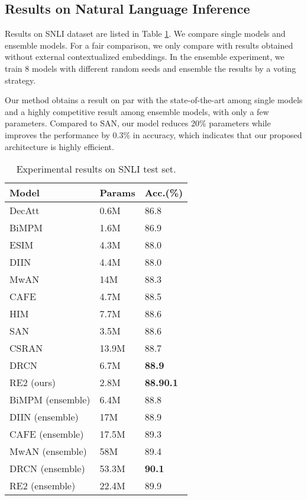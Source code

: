 \documentclass[11pt,a4paper]{article}
\begin{document}
\subsection{Results on Natural Language Inference}

Results on SNLI dataset are listed in Table \ref{tab:snli-result}. We compare single models and ensemble models. For a fair comparison, we only compare with results obtained without external contextualized embeddings. In the ensemble experiment, we train 8 models with different random seeds and ensemble the results by a voting strategy. 

Our method obtains a result on par with the state-of-the-art among single models and a highly competitive result among ensemble models, with only a few parameters. Compared to SAN, our model reduces 20\% parameters while improves the performance by 0.3\% in accuracy, which indicates that our proposed architecture is highly efficient. 

\begin{table}
  \centering
  \small
  \begin{tabular}{|l|l|l|}
  \hline
  {\bf Model} & {\bf Params} & {\bf Acc.(\%)}\\\hline
    DecAtt \cite{parikh2016decomposable} & 0.6M & 86.8 \\
    BiMPM \cite{wang2017bilateral} & 1.6M & 86.9 \\
    ESIM \cite{chen2017enhanced} & 4.3M & 88.0 \\ 
    DIIN \cite{gong2018natural} & 4.4M & 88.0 \\ 
    MwAN \cite{tan2018multiway} & 14M & 88.3 \\
    CAFE \cite{tay2018compare} & 4.7M & 88.5 \\
    HIM \cite{chen2017enhanced} & 7.7M & 88.6 \\
    SAN \cite{liu2018stochastic} & 3.5M & 88.6 \\
    CSRAN \cite{tay2018co} & 13.9M & 88.7 \\
    DRCN \cite{kim2018semantic} & 6.7M & {\bf 88.9} \\\hline
    RE2 (ours)& 2.8M & {\bf 88.90.1}\\\hline
    BiMPM (ensemble) & 6.4M & 88.8 \\
    DIIN (ensemble) & 17M & 88.9 \\
    CAFE (ensemble) & 17.5M & 89.3 \\
    MwAN (ensemble) & 58M & 89.4 \\
    DRCN (ensemble) & 53.3M & {\bf 90.1} \\\hline
    RE2 (ensemble) & 22.4M & 89.9 \\\hline
  \end{tabular}
  \caption{Experimental results on SNLI test set.}\label{tab:snli-result}
\end{table}
\end{document}
